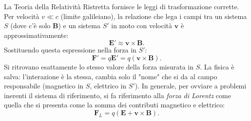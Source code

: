 \documentclass[a4paper,11pt]{report}
\begin{document}
La Teoria della Relatività Ristretta fornisce le leggi di trasformazione corrette. Per velocità $v \ll c$ (limite galileiano), la relazione che lega i campi tra un sistema $S$ (dove c'è solo $\bm{B}$) e un sistema $S'$ in moto con velocità $\bm{v}$ è approssimativamente:
\begin{equation}
    \bm{E}' \approx \bm{v} \times \bm{B}.
\end{equation}
Sostituendo questa espressione nella forza in $S'$:
\begin{equation}
    \bm{F}' = q \bm{E}' = q (\bm{v} \times \bm{B}).
\end{equation}
Si ritrovano esattamente lo stesso valore della forza misurata in $S$. La fisica è salva: l'interazione è la stessa, cambia solo il "nome" che si da al campo responsabile (magnetico in $S$, elettrico in $S'$). In generale, per ovviare a problemi inerenti il sistema di riferimento, si fa riferimento alla \textit{forza di Lorentz} come quella che si presenta come la somma dei contributi magnetico e elettrico:
\begin{equation}
    \bm{F}_L = q (\bm{E} +\bm{v} \times \bm{B}).
\end{equation}
\end{document}
